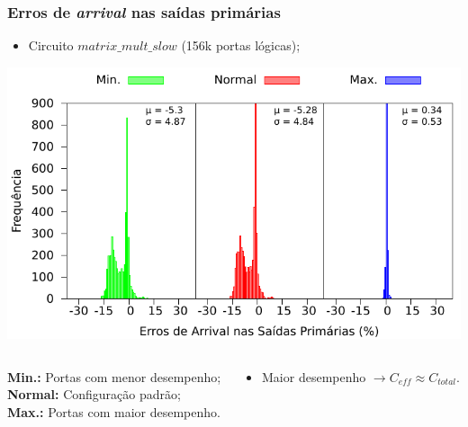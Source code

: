 \documentclass[10pt,a4paper]{beamer}
\begin{document}
%		
		\begin{frame}[t]
			\frametitle{Erros de \textit{arrival} nas saídas primárias}
			\begin{itemize}
				\item Circuito $matrix\_mult\_slow$ (156k portas lógicas);
			\end{itemize}
			\begin{center}
				\includegraphics[width=0.8\linewidth]{img/arrival_error/matrix_mult_puri.pdf}\\
			\end{center}
			\vspace{-.6cm}
			\begin{columns}
					\begin{column}{0.4 \textwidth}
						\begin{shaded}
							\scriptsize{\textbf{Min.:} Portas com menor desempenho;} \\
							\scriptsize{\textbf{Normal:} Configuração padrão;}\\
							\scriptsize{\textbf{Max.:} Portas com maior desempenho.}
						\end{shaded}
					\end{column}
					\begin{column}{0.6 \textwidth}
						\begin{itemize}
							\item Maior desempenho $\to C_{eff} \approx C_{total}$.
						\end{itemize}
					\end{column}
				\end{columns}			
		\end{frame}
		
\end{document}
